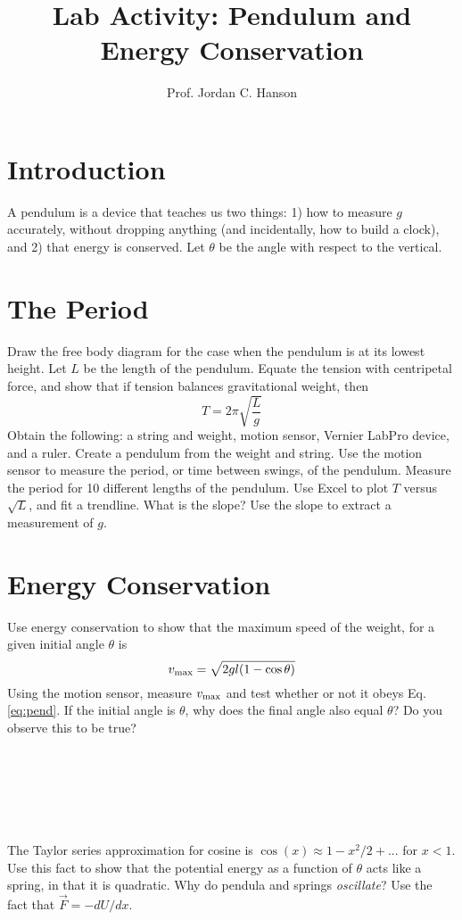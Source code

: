 \documentclass{article}
\begin{document}
\title{Lab Activity: Pendulum and Energy Conservation}
\author{Prof. Jordan C. Hanson}

\maketitle

\section{Introduction}
A pendulum is a device that teaches us two things: 1) how to measure $g$ accurately, without dropping anything (and incidentally, how to build a clock), and 2) that energy is conserved. Let $\theta$ be the angle with respect to the vertical.

\section{The Period}

Draw the free body diagram for the case when the pendulum is at its lowest height.  Let $L$ be the length of the pendulum.  Equate the tension with centripetal force, and show that if tension balances gravitational weight, then
\begin{equation}
T = 2\pi \sqrt{\frac{L}{g}}
\end{equation}
Obtain the following: a string and weight, motion sensor, Vernier LabPro device, and a ruler.  Create a pendulum from the weight and string.  Use the motion sensor to measure the period, or time between swings, of the pendulum.  Measure the period for 10 different lengths of the pendulum.  Use Excel to plot $T$ versus $\sqrt{L}$, and fit a trendline.  What is the slope?  Use the slope to extract a measurement of $g$. \\ \vspace{1.5cm}
\section{Energy Conservation}
Use energy conservation to show that the maximum speed of the weight, for a given initial angle $\theta$ is
\begin{equation}
v_{\rm max} = \sqrt{2gl(1-\cos\theta)} \label{eq:pend}
\end{equation}
Using the motion sensor, measure $v_{\rm max}$ and test whether or not it obeys Eq. \ref{eq:pend}.  If the initial angle is $\theta$, why does the final angle also equal $\theta$?  Do you observe this to be true? \\ \\ \\ \\ \\ \\ \\
The Taylor series approximation for cosine is $\cos(x) \approx 1 - x^2/2 + ...$ for $x<1$.  Use this fact to show that the potential energy as a function of $\theta$ acts like a spring, in that it is quadratic.  Why do pendula and springs \textit{oscillate}?  Use the fact that
$\vec{F} = -dU/dx$.
\end{document}
